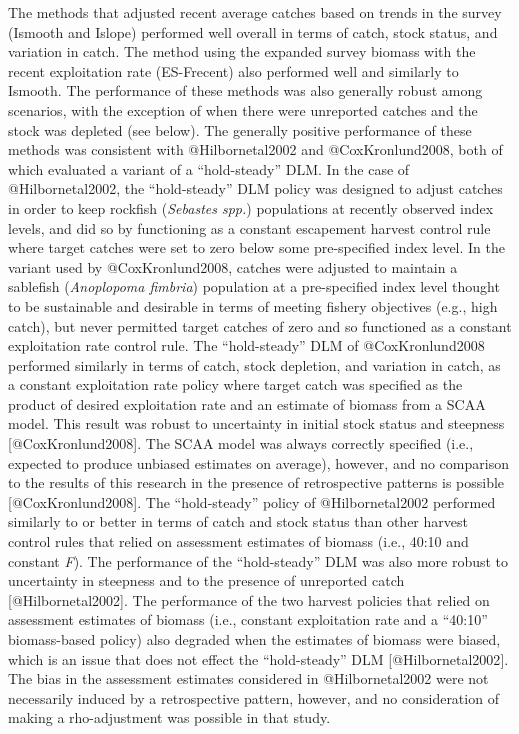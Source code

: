 \documentclass[
]{article}
\begin{document}
The methods that adjusted recent average catches based on trends in the survey (Ismooth and Islope) performed well overall in terms of catch, stock status, and variation in catch. The method using the expanded survey biomass with the recent exploitation rate (ES-Frecent) also performed well and similarly to Ismooth. The performance of these methods was also generally robust among scenarios, with the exception of when there were unreported catches and the stock was depleted (see below). The generally positive performance of these methods was consistent with @Hilbornetal2002 and @CoxKronlund2008, both of which evaluated a variant of a ``hold-steady'' DLM. In the case of @Hilbornetal2002, the ``hold-steady'' DLM policy was designed to adjust catches in order to keep rockfish (\emph{Sebastes spp.}) populations at recently observed index levels, and did so by functioning as a constant escapement harvest control rule where target catches were set to zero below some pre-specified index level. In the variant used by @CoxKronlund2008, catches were adjusted to maintain a sablefish (\emph{Anoplopoma fimbria}) population at a pre-specified index level thought to be sustainable and desirable in terms of meeting fishery objectives (e.g., high catch), but never permitted target catches of zero and so functioned as a constant exploitation rate control rule. The ``hold-steady'' DLM of @CoxKronlund2008 performed similarly in terms of catch, stock depletion, and variation in catch, as a constant exploitation rate policy where target catch was specified as the product of desired exploitation rate and an estimate of biomass from a SCAA model. This result was robust to uncertainty in initial stock status and steepness {[}@CoxKronlund2008{]}. The SCAA model was always correctly specified (i.e., expected to produce unbiased estimates on average), however, and no comparison to the results of this research in the presence of retrospective patterns is possible {[}@CoxKronlund2008{]}. The ``hold-steady'' policy of @Hilbornetal2002 performed similarly to or better in terms of catch and stock status than other harvest control rules that relied on assessment estimates of biomass (i.e., 40:10 and constant \emph{F}). The performance of the ``hold-steady'' DLM was also more robust to uncertainty in steepness and to the presence of unreported catch {[}@Hilbornetal2002{]}. The performance of the two harvest policies that relied on assessment estimates of biomass (i.e., constant exploitation rate and a ``40:10'' biomass-based policy) also degraded when the estimates of biomass were biased, which is an issue that does not effect the ``hold-steady'' DLM {[}@Hilbornetal2002{]}. The bias in the assessment estimates considered in @Hilbornetal2002 were not necessarily induced by a retrospective pattern, however, and no consideration of making a rho-adjustment was possible in that study.
\end{document}
